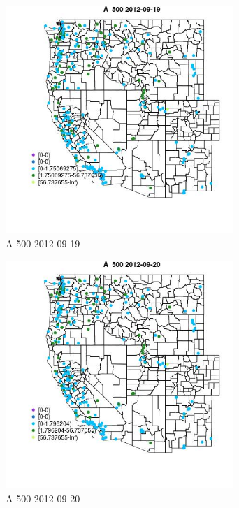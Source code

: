 \begin{figure} 
\centering  
\includegraphics[width=0.77\textwidth]{Code_Outputs/ML_input_report_ML_input_PM25_Step5_part_d_de_duplicated_aves_ML_input_MapObsA_5002012-09-19.jpg} 
\caption{\label{fig:ML_input_report_ML_input_PM25_Step5_part_d_de_duplicated_aves_ML_inputMapObsA_5002012-09-19}A-500 2012-09-19} 
\end{figure} 
 

\begin{figure} 
\centering  
\includegraphics[width=0.77\textwidth]{Code_Outputs/ML_input_report_ML_input_PM25_Step5_part_d_de_duplicated_aves_ML_input_MapObsA_5002012-09-20.jpg} 
\caption{\label{fig:ML_input_report_ML_input_PM25_Step5_part_d_de_duplicated_aves_ML_inputMapObsA_5002012-09-20}A-500 2012-09-20} 
\end{figure} 
 

